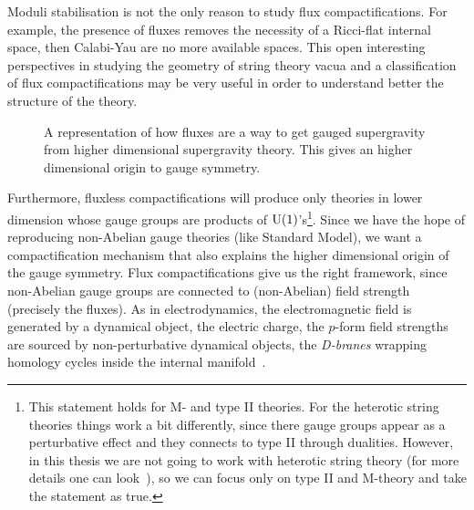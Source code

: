 \documentclass[debug]{phd}
\begin{document}
				Moduli stabilisation is not the only reason to study flux compactifications.
				For example, the presence of fluxes removes the necessity of a Ricci-flat internal space, then Calabi-Yau are no more available spaces.
				This open interesting perspectives in studying the geometry of string theory vacua and a classification of flux compactifications may be very useful in order to understand better the structure of the theory.
				
						\begin{figure}[h!]
							\centering
							
							\caption{A representation of how fluxes are a way to get gauged supergravity from higher dimensional supergravity theory.
									This gives an higher dimensional origin to gauge symmetry.}
							\label{gaugedsugra}
						\end{figure}
				
				Furthermore, fluxless compactifications will produce only theories in lower dimension whose gauge groups are products of $\mathrm{U}(1)$'s\footnote{%
					This statement holds for M- and type II theories.
					For the heterotic string theories things work a bit differently, since there gauge groups appear as a perturbative effect and they connects to type II through dualities.
					However, in this thesis we are not going to work with heterotic string theory (for more details one can look~\cite{polchinski}), so we can focus only on type II and M-theory and take the statement as true.}.
				Since we have the hope of reproducing non-Abelian gauge theories (like Standard Model), we want a compactification mechanism that also explains the higher dimensional origin of the gauge symmetry.
				Flux compactifications give us the right framework, since non-Abelian gauge groups are connected to (non-Abelian) field strength (precisely the fluxes).
				As in electrodynamics, the electromagnetic field is generated by a dynamical object, the electric charge, the $p$-form field strengths are sourced by non-perturbative dynamical objects, the \emph{D-branes} wrapping homology cycles inside the internal manifold~\cite{PolchinskiBranes}.
				
\end{document}
